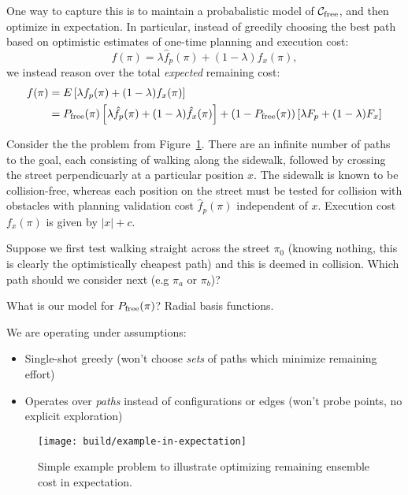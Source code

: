 {One way to capture this is to maintain a probabalistic model
of $\mathcal{C}_{\mbox{\scriptsize free}}$,
and then optimize in expectation.
In particular,
instead of greedily choosing the best path based on
optimistic estimates of one-time planning and execution cost:
\begin{equation}
   f(\pi) = \lambda \hat{f}_p(\pi) + (1-\lambda) \hat{f}_x(\pi),
\end{equation}
we instead reason over the total \emph{expected} remaining cost:
\begin{align}
   f(\pi)
      &= E \left[ \lambda f_p(\pi) + (1-\lambda) f_x(\pi) \right] \\
   &= P_{\mbox{\scriptsize free}}(\pi)
      \left[ \lambda \hat{f}_p(\pi) + (1-\lambda) \hat{f}_x(\pi) \right]
      + (1-P_{\mbox{\scriptsize free}}(\pi))
      \left[ \lambda F_p + (1-\lambda) F_x \right]
\end{align}

Consider the the problem from Figure~\ref{fig:example-in-expectation}.
There are an infinite number of paths to the goal,
each consisting of walking along the sidewalk,
followed by crossing the street perpendicuarly at a particular
position $x$.
The sidewalk is known to be collision-free,
whereas each position on the street must be tested for collision
with obstacles with planning validation cost $\hat{f}_p(\pi)$
independent of $x$.
Execution cost $f_x(\pi)$ is given by $|x|+c$.

Suppose we first test walking straight across the street $\pi_0$
(knowing nothing, this is clearly the optimistically cheapest path)
and this is deemed in collision.
Which path should we consider next (e.g $\pi_a$ or $\pi_b$)?

What is our model for $P_{\mbox{\scriptsize free}}(\pi)$?
Radial basis functions.

We are operating under assumptions:
\begin{itemize}
\item Single-shot greedy (won't choose \emph{sets} of paths
   which minimize remaining effort)
\item Operates over \emph{paths} instead of configurations
   or edges (won't probe points, no explicit exploration)
\end{itemize}

\begin{figure}
   \begin{center}
   \texttt{[image: build/example-in-expectation]}
   \end{center}
   \caption{Simple example problem to illustrate optimizing
      remaining ensemble cost in expectation.}
   \label{fig:example-in-expectation}
\end{figure}

}
